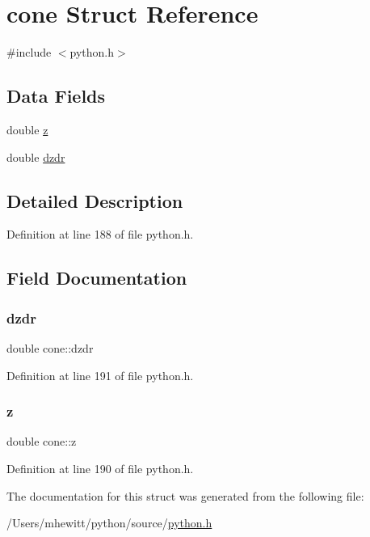 \hypertarget{structcone}{}\section{cone Struct Reference}
\label{structcone}


{\ttfamily \#include $<$python.\+h$>$}

\subsection*{Data Fields}
\begin{DoxyCompactItemize}
\item 
double \hyperlink{structcone_ac8738a797e92edcc7176b261d9314537}{z}
\item 
double \hyperlink{structcone_a7b46c04ac9e52b4f1ffe0dd589a0e102}{dzdr}
\end{DoxyCompactItemize}


\subsection{Detailed Description}


Definition at line 188 of file python.\+h.



\subsection{Field Documentation}
\mbox{\label{structcone_a7b46c04ac9e52b4f1ffe0dd589a0e102}} 
\subsubsection{\texorpdfstring{dzdr}{dzdr}}
{\footnotesize\ttfamily double cone\+::dzdr}



Definition at line 191 of file python.\+h.

\mbox{\label{structcone_ac8738a797e92edcc7176b261d9314537}} 
\subsubsection{\texorpdfstring{z}{z}}
{\footnotesize\ttfamily double cone\+::z}



Definition at line 190 of file python.\+h.



The documentation for this struct was generated from the following file\+:\begin{DoxyCompactItemize}
\item 
/\+Users/mhewitt/python/source/\hyperlink{python_8h}{python.\+h}\end{DoxyCompactItemize}
